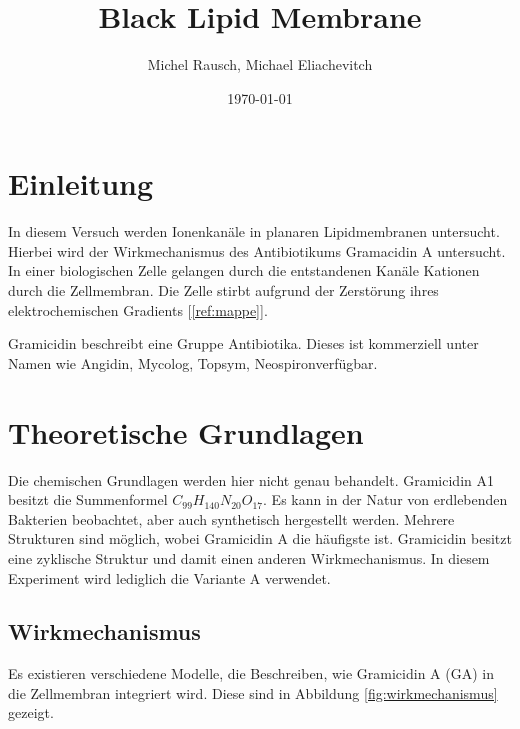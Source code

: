 \documentclass[a4paper,ngerman]{scrartcl}
\title{Black Lipid Membrane}
\date{\today}
\author{Michel Rausch, Michael Eliachevitch}
\begin{document}
\maketitle
\tableofcontents
\newpage

\section{Einleitung}

In diesem Versuch werden Ionenkanäle in planaren Lipidmembranen untersucht. Hierbei wird der Wirkmechanismus des Antibiotikums Gramacidin A untersucht. In einer biologischen Zelle gelangen durch die entstandenen Kanäle Kationen durch die Zellmembran. Die Zelle stirbt aufgrund der Zerstörung ihres elektrochemischen Gradients [\ref{ref:mappe}].

Gramicidin beschreibt eine Gruppe Antibiotika. Dieses ist kommerziell unter Namen wie Angidin\textregistered , Mycolog\textregistered , Topsym\textregistered , Neospiron\textregistered  verfügbar. 


\section{Theoretische Grundlagen}

Die chemischen Grundlagen werden hier nicht genau behandelt. Gramicidin A1 besitzt die Summenformel $C_{99}H_{140}N_{20}O_{17}$. Es kann in der Natur von erdlebenden Bakterien beobachtet, aber auch synthetisch hergestellt werden. Mehrere Strukturen sind möglich, wobei Gramicidin A die häufigste ist. Gramicidin besitzt eine zyklische Struktur und damit einen anderen Wirkmechanismus. In diesem Experiment wird lediglich die Variante A verwendet.

\subsection{Wirkmechanismus}

Es existieren verschiedene Modelle, die Beschreiben, wie Gramicidin A (GA) in die Zellmembran integriert wird. Diese sind in Abbildung \ref{fig:wirkmechanismus} gezeigt.
\end{document}
